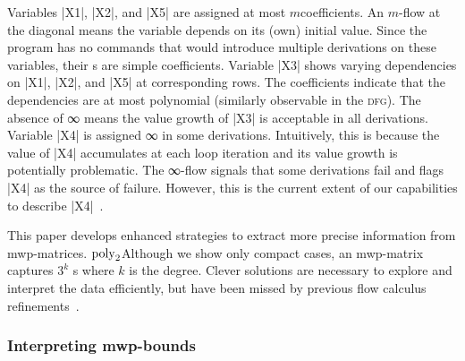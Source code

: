 \begin{example}
\noindent{}Variables \pr|X1|, \pr|X2|, and \pr|X5| are assigned at most
\(m\)coefficients. An \(m\)-flow at the  diagonal
means the variable depends on its (own) initial value. Since the program has no
commands that would introduce multiple derivations on these variables, their
s are simple coefficients. Variable \pr|X3| shows
varying dependencies on \pr|X1|, \pr|X2|, and \pr|X5| at corresponding rows. The
coefficients indicate that the dependencies are at most
polynomial (similarly observable in the \textsc{dfg}). The absence of
∞ means the value growth of \pr|X3| is acceptable in all
derivations. Variable \pr|X4| is assigned ∞ in some derivations.
Intuitively, this is because the value of \pr|X4| accumulates at each loop
iteration and its value growth is potentially problematic. The
∞-flow signals that some derivations fail
and flags \pr|X4| as the source of failure. However, this is the current extent
of our capabilities to describe \pr|X4|~\cite{aubert2023b}.
\end{example}

\noindent This paper develops enhanced strategies to extract more precise
information from mwp-matrices. $\operatorname{poly}_2$Although we
show only compact cases, an mwp-matrix captures \(3^k\) s where
\(k\) is the degree. Clever solutions are necessary to explore and
interpret the  data efficiently, but have been missed by
previous flow calculus
refinements~\cite{aubert20222,aubert2023b}.

\subsubsection{Interpreting mwp-bounds}
\label{subsec:interpreting-mwp-bounds}


